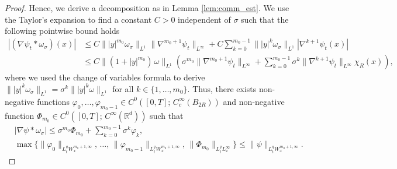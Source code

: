 \documentclass[reqno, 11pt]{amsart}
\numberwithin{equation}{section}
\theoremstyle{definition}
\begin{document}
\begin{proof}
    Hence, we derive a decomposition as in Lemma \ref{lem:comm_est}. We use the Taylor's expansion to find a constant $C>0$ independent of $\sigma$ such that the following pointwise bound holds
    \begin{align*}
        |(\nabla\psi_t\ast\omega_\sigma)(x)|
        &\leq C\||y|^{m_0}\omega_\sigma\|_{L^1}\|\nabla^{m_0+1}\psi_t\|_{L^\infty}+C\sum_{k=0}^{m_0-1}
        \||y|^k\omega_\sigma\|_{L^1}
        |\nabla^{k+1} \psi_t(x)|\\
        &\leq C\|(1+|y|^{m_0})\,\omega\|_{L^1}\left(\sigma^{m_0}\|\nabla^{m_0+1}\psi_t\|_{ L^\infty}+\sum_{k=0}^{m_0-1}
        \sigma^{k}\|\nabla^{k+1} \psi_t\|_{L^\infty}\chi_R(x)\right),
    \end{align*}
    where we used the change of variables formula to derive $\||y|^k\omega_\sigma\|_{L^1}=\sigma^{k}\||y|^k\omega\|_{L^1}$ for all $k\in \{1,\ldots,m_0\}$. Thus, there exists non-negative functions $\varphi_0,\ldots,\varphi_{m_0-1}\in C^0([0,T];\, C_c^\infty(B_{2R}))$ and non-negative function $\Phi_{m_0}\in C^0([0,T];\,C^\infty(\mathbb{R}^{d}))$ such that
    \begin{align}
        \label{eq:conv_decomp}
        &|\nabla\psi\ast \omega_\sigma|
        \leq \sigma^{m_0}\Phi_{m_0}+\sum_{k=0}^{m_0-1} \sigma^{k}\varphi_k,\\
        \label{eq:decomp_norm}
        &\max\{\|\varphi_0\|_{L_t^q W_x^{m_0+1,\infty}},\,\ldots,\,\|\varphi_{m_0-1}\|_{L_t^q W_x^{m_0+1,\infty}},\,\|\Phi_{m_0}\|_{L_t^q L_x^\infty}\}\leq \|\psi\|_{L_t^q W_x^{m_0+1,\infty}}.
    \end{align}
    

\end{proof}
\end{document}
